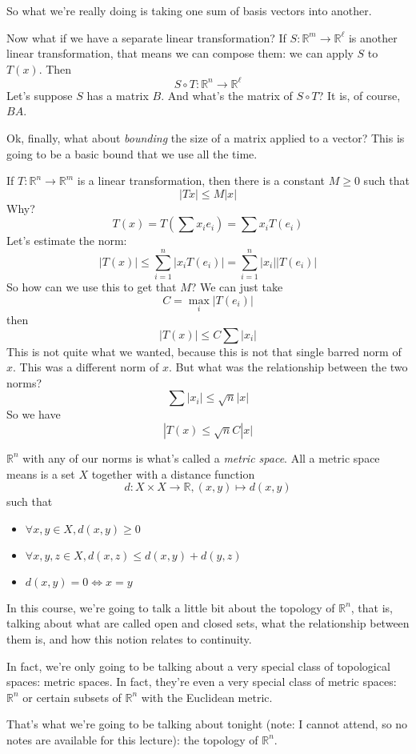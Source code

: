 \documentclass{article}
\newcommand{\reals}[0]{\mathbb{R}}
\begin{document}
So what we're really doing is taking one sum of basis vectors into another.

Now what if we have a separate linear transformation? If \(S: \reals^m \to \reals^\ell\) is another linear transformation, that means we can compose them: we can apply \(S\) to \(T(x)\). Then
\[S \circ T: \reals^n \to \reals^\ell\]
Let's suppose \(S\) has a matrix \(B\). And what's the matrix of \(S \circ T\)? It is, of course, \(BA\).

Ok, finally, what about \textit{bounding} the size of a matrix applied to a vector? This is going to be a basic bound that we use all the time.

If \(T: \reals^n \to \reals^m\) is a linear transformation, then there is a constant \(M \geq 0\) such that
\[|Tx| \leq M|x|\]
Why?
\[T(x) = T\left(\sum x_ie_i\right) = \sum x_iT(e_i)\]
Let's estimate the norm:
\[|T(x)| \leq \sum_{i = 1}^n|x_iT(e_i)| = \sum_{i = 1}^n|x_i||T(e_i)|\]
So how can we use this to get that \(M\)? We can just take
\[C = \max_{i}|T(e_i)|\]
then
\[|T(x)| \leq C\sum|x_i|\]
This is not quite what we wanted, because this is not that single barred norm of \(x\). This was a different norm of \(x\). But what was the relationship between the two norms?
\[\sum|x_i| \leq \sqrt{n}|x|\]
So we have
\[|T(x) \leq \sqrt{n}C|x|\]

\(\reals^n\) with any of our norms is what's called a \textit{metric space}. All a metric space means is a set \(X\) together with a distance function
\[d: X \times X \to \reals, (x, y) \mapsto d(x, y)\]
such that
\begin{itemize}
  \item \(\forall x, y \in X, d(x, y) \geq 0\)
  \item \(\forall x, y, z \in X, d(x, z) \leq d(x, y) + d(y, z)\)
  \item \(d(x, y) = 0 \iff x = y\)
\end{itemize}

In this course, we're going to talk a little bit about the topology of \(\reals^n\), that is, talking about what are called open and closed sets, what the relationship between them is, and how this notion relates to continuity.

In fact, we're only going to be talking about a very special class of topological spaces: metric spaces. In fact, they're even a very special class of metric spaces: \(\reals^n\) or certain subsets of \(\reals^n\) with the Euclidean metric.

That's what we're going to be talking about tonight (note: I cannot attend, so no notes are available for this lecture): the topology of \(\reals^n\).
\end{document}
